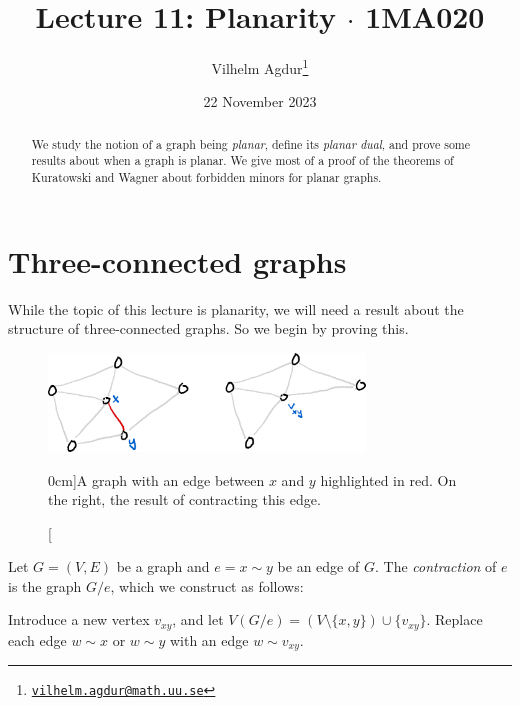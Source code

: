\documentclass[nobib]{tufte-handout}
\title{Lecture 11: Planarity $\cdot$ 1MA020}
\author[Vilhelm Agdur]{Vilhelm Agdur\thanks{\href{mailto:vilhelm.agdur@math.uu.se}{\nolinkurl{vilhelm.agdur@math.uu.se}}}}
\date{22 November 2023}
\begin{document}
\maketitle%

\begin{abstract}
\noindent
We study the notion of a graph being \emph{planar}, define its \emph{planar dual}, and prove some results about when a graph is planar. We give most of a proof of the theorems of Kuratowski and Wagner about forbidden minors for planar graphs.
\end{abstract}

\section{Three-connected graphs}

While the topic of this lecture is planarity, we will need a result about the structure of three-connected graphs. So we begin by proving this.

\begin{figure}
  \centering
  \includegraphics[width=0.75\textwidth]{graphics/L11_planarity/edge_contraction.png}
  \caption[][0cm]{A graph with an edge between $x$ and $y$ highlighted in red. On the right, the result of contracting this edge.}
  \label{fig:edge_contraction}
\end{figure}

\begin{definition}
  Let $G = (V,E)$ be a graph and $e = x\sim y$ be an edge of $G$. The \emph{contraction} of $e$ is the graph $G/e$, which we construct as follows:

  Introduce a new vertex $v_{xy}$, and let $V(G/e) = (V \setminus \{x,y\}) \cup \{v_{xy}\}$. Replace each edge $w \sim x$ or $w \sim y$ with an edge $w \sim v_{xy}$.
\end{definition}
\end{document}

